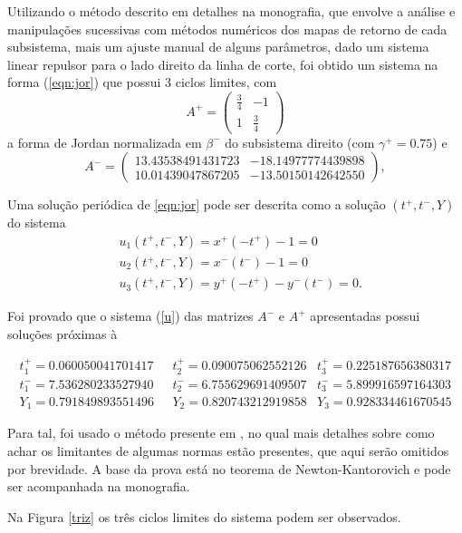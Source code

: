 \documentclass[12pt]{article}
\begin{document}
Utilizando o método descrito em detalhes na monografia, que envolve a análise e manipulações sucessivas com métodos numéricos dos mapas de retorno de cada subsistema, mais um ajuste manual de alguns parâmetros, dado um sistema linear repulsor para o lado direito da linha de corte, foi obtido um sistema na forma (\ref{eqn:jor}) que possui 3 ciclos limites, com
\[
A^+=
\begin{pmatrix}
\frac{3}{4}& -1\\
1& \frac{3}{4}
\end{pmatrix}
\]
a forma de Jordan normalizada em $\beta^-$ do subsistema direito (com $\gamma^+=0.75$) e
\[
A^-=
\begin{pmatrix}
13.43538491431723& -18.14977774439898\\
10.01439047867205& -13.50150142642550
\end{pmatrix},
\]

Uma solução periódica de \ref{eqn:jor} pode ser descrita como a solução $(t^+, t^-, Y)$ do sistema
\begin{align}
\label{u}
&u_{1}\left(t^{+}, t^{-}, Y\right)=x^{+}\left(-t^{+}\right)-1=0 \nonumber\\
&u_{2}\left(t^{+}, t^{-}, Y\right)=x^{-}\left(t^{-}\right)-1=0 \\
&u_{3}\left(t^{+}, t^{-}, Y\right)=y^{+}\left(-t^{+}\right)-y^{-}\left(t^{-}\right)=0\nonumber.
\end{align}

Foi provado que o sistema (\ref{u}) das matrizes $A^-$ e $A^+$ apresentadas possui soluções próximas à

$$\begin{array}{l|l|l}
t^+_1 = 0.060050041701417& \ \ \ t^+_2 = 0.090075062552126&t^+_3 = 0.225187656380317\\
t^-_1 = 7.536280233527940& \ \ \ t^-_2 = 6.755629691409507&t^-_3 = 5.899916597164303\\
Y_1 = 0.791849893551496& \ \ \ Y_2 = 0.820743212919858&Y_3 = 0.928334461670545
\end{array}$$

Para tal, foi usado o método presente em \cite{LilPonce2012}, no qual mais detalhes sobre como achar os limitantes de algumas normas estão presentes, que aqui serão omitidos por brevidade. A base da prova está no teorema de Newton-Kantorovich e pode ser acompanhada na monografia.

Na Figura \ref{triz} os três ciclos limites do sistema podem ser observados.
\end{document}
